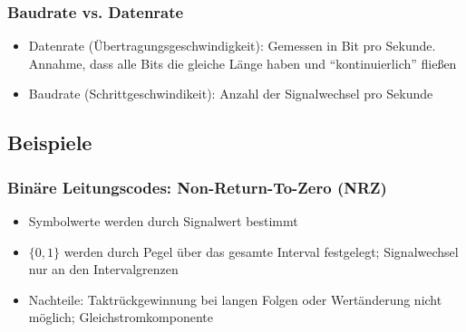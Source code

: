 \subsubsection{Baudrate vs. Datenrate}
\begin{itemize}
	\item Datenrate (Übertragungsgeschwindigkeit): Gemessen in Bit pro Sekunde. Annahme, dass alle Bits die gleiche Länge haben und "`kontinuierlich"' fließen
	\item Baudrate (Schrittgeschwindikeit): Anzahl der Signalwechsel pro Sekunde
\end{itemize}


\subsection{Beispiele}

\subsubsection{Binäre Leitungscodes: Non-Return-To-Zero (NRZ)}
\begin{itemize}
	\item Symbolwerte werden durch Signalwert bestimmt
	\item \(\{0,1\}\) werden durch Pegel über das gesamte Interval festgelegt; Signalwechsel nur an den Intervalgrenzen
	\item Nachteile: Taktrückgewinnung bei langen Folgen oder Wertänderung nicht möglich; Gleichstromkomponente
\end{itemize}


